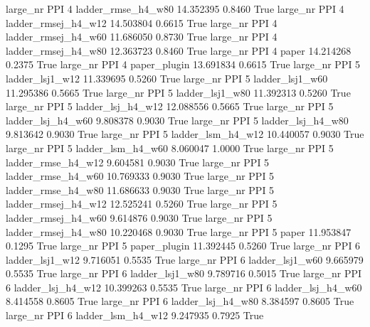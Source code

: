   large_nr      PPI                 4  ladder_rmse_h4_w80   14.352395      0.8460    True
  large_nr      PPI                 4 ladder_rmsej_h4_w12   14.503804      0.6615    True
  large_nr      PPI                 4 ladder_rmsej_h4_w60   11.686050      0.8730    True
  large_nr      PPI                 4 ladder_rmsej_h4_w80   12.363723      0.8460    True
  large_nr      PPI                 4               paper   14.214268      0.2375    True
  large_nr      PPI                 4        paper_plugin   13.691834      0.6615    True
  large_nr      PPI                 5     ladder_lsj1_w12   11.339695      0.5260    True
  large_nr      PPI                 5     ladder_lsj1_w60   11.295386      0.5665    True
  large_nr      PPI                 5     ladder_lsj1_w80   11.392313      0.5260    True
  large_nr      PPI                 5   ladder_lsj_h4_w12   12.088556      0.5665    True
  large_nr      PPI                 5   ladder_lsj_h4_w60    9.808378      0.9030    True
  large_nr      PPI                 5   ladder_lsj_h4_w80    9.813642      0.9030    True
  large_nr      PPI                 5   ladder_lsm_h4_w12   10.440057      0.9030    True
  large_nr      PPI                 5   ladder_lsm_h4_w60    8.060047      1.0000    True
  large_nr      PPI                 5  ladder_rmse_h4_w12    9.604581      0.9030    True
  large_nr      PPI                 5  ladder_rmse_h4_w60   10.769333      0.9030    True
  large_nr      PPI                 5  ladder_rmse_h4_w80   11.686633      0.9030    True
  large_nr      PPI                 5 ladder_rmsej_h4_w12   12.525241      0.5260    True
  large_nr      PPI                 5 ladder_rmsej_h4_w60    9.614876      0.9030    True
  large_nr      PPI                 5 ladder_rmsej_h4_w80   10.220468      0.9030    True
  large_nr      PPI                 5               paper   11.953847      0.1295    True
  large_nr      PPI                 5        paper_plugin   11.392445      0.5260    True
  large_nr      PPI                 6     ladder_lsj1_w12    9.716051      0.5535    True
  large_nr      PPI                 6     ladder_lsj1_w60    9.665979      0.5535    True
  large_nr      PPI                 6     ladder_lsj1_w80    9.789716      0.5015    True
  large_nr      PPI                 6   ladder_lsj_h4_w12   10.399263      0.5535    True
  large_nr      PPI                 6   ladder_lsj_h4_w60    8.414558      0.8605    True
  large_nr      PPI                 6   ladder_lsj_h4_w80    8.384597      0.8605    True
  large_nr      PPI                 6   ladder_lsm_h4_w12    9.247935      0.7925    True

